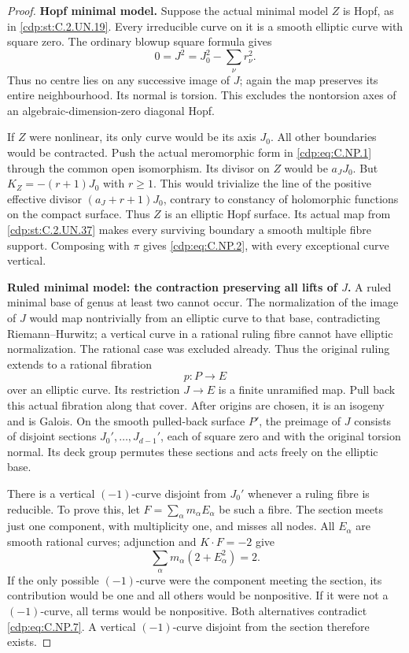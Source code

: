 \begin{proof}
\par\medskip\noindent\textbf{Hopf minimal model.}
Suppose the actual minimal
model \(Z\) is Hopf, as in
\ref{cdp:st:C.2.UN.19}. Every irreducible
curve on it is a smooth
elliptic curve with square
zero. The ordinary blowup
square formula gives
\[
                 0=J^2=J_0^2-\sum_\nu r_\nu^2.
 \tag{C.NP.5}\label{cdp:eq:C.NP.5}
\]
Thus no centre lies on
any successive image of
\(J\); again the map
preserves its entire
neighbourhood. Its normal
is torsion. This excludes
the nontorsion axes of an
algebraic-dimension-zero
diagonal Hopf.

If \(Z\) were nonlinear,
its only curve would be
its axis \(J_0\). All
other boundaries would
be contracted. Push the
actual meromorphic form
in \eqref{cdp:eq:C.NP.1} through the
common open isomorphism.
Its divisor on \(Z\)
would be \(a_JJ_0\).
But \(K_Z=-(r+1)J_0\)
with \(r\ge1\). This
would trivialize the
line of the positive
effective divisor
\((a_J+r+1)J_0\), contrary
to constancy of holomorphic
functions on the compact
surface. Thus \(Z\) is
an elliptic Hopf surface.
Its actual map from \ref{cdp:st:C.2.UN.37}
makes every surviving
boundary a smooth multiple
fibre support. Composing
with \(\pi\) gives \eqref{cdp:eq:C.NP.2},
with every exceptional
curve vertical.

\par\medskip\noindent\textbf{Ruled minimal model: the contraction preserving all lifts of \(J\).}
A ruled minimal base of
genus at least two cannot
occur. The normalization
of the image of \(J\)
would map nontrivially
from an elliptic curve
to that base, contradicting
Riemann--Hurwitz; a
vertical curve in a
rational ruling fibre
cannot have elliptic
normalization. The
rational case was
excluded already.
Thus the original ruling
extends to a rational
fibration
\[
                             p:P\longrightarrow E
 \tag{C.NP.6}\label{cdp:eq:C.NP.6}
\]
over an elliptic curve.
Its restriction \(J\to E\)
is a finite unramified
map. Pull back this
actual fibration along
that cover. After origins
are chosen, it is an
isogeny and is Galois.
On the smooth pulled-back
surface \(P'\), the
preimage of \(J\) consists
of disjoint sections
\(J_0',\ldots,J_{d-1}'\),
each of square zero and
with the original torsion
normal. Its deck group
permutes these sections
and acts freely on the
elliptic base.

There is a vertical
\((-1)\)-curve disjoint
from \(J_0'\) whenever
a ruling fibre is reducible.
To prove this, let
\(F=\sum_\alpha m_\alpha E_\alpha\)
be such a fibre. The
section meets just one
component, with multiplicity
one, and misses all nodes.
All \(E_\alpha\) are
smooth rational curves;
adjunction and \(K\cdot F=-2\)
give
\[
             \sum_\alpha
                    m_\alpha(2+E_\alpha^2)=2 .
 \tag{C.NP.7}\label{cdp:eq:C.NP.7}
\]
If the only possible
\((-1)\)-curve were the
component meeting the
section, its contribution
would be one and all
others would be nonpositive.
If it were not a
\((-1)\)-curve, all terms
would be nonpositive.
Both alternatives contradict
\eqref{cdp:eq:C.NP.7}. A vertical
\((-1)\)-curve disjoint
from the section therefore
exists.


\end{proof}
